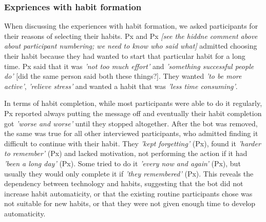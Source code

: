 \documentclass{scaffold/sigchi}
\begin{document}

 
\subsubsection{Expriences with habit formation}
When discussing the experiences with habit formation, we asked participants for their reasons of selecting their habits. Px and Px \emph{[see the hiddne comment above about participant numbering; we need to know who said what]} admitted choosing their habit because they had wanted to start that particular habit for a long time. Px said that it was \textit{'not too much effort'} and \textit{'something successful people do'} [did the same person said both these things?]. They wanted \textit{'to be more active'}, \textit{'relieve stress'} and wanted a habit that was \textit{'less time consuming'}. 

In terms of habit completion, while most participants were able to do it regularly, Px reported always putting the message off and eventually their habit completion got \textit{'worse and worse'} until they stopped altogether. After the bot was removed, the same was true for all other interviewed participants, who admitted finding it difficult to continue with their habit. They \textit{'kept forgetting'} (Px), found it \textit{'harder to remember'} (Px) and lacked motivation, not performing the action if it had \textit{'been a long day'} (Px). Some tried to do it \textit{'every now and again'} (Px), but usually they would only complete it if \textit{'they remembered'} (Px). This reveals the dependency between technology and habits, suggesting that the bot did not increase habit automaticity, or that the existing routine participants chose was not suitable for new habits, or that they were not given enough time to develop automaticity.
\end{document}
